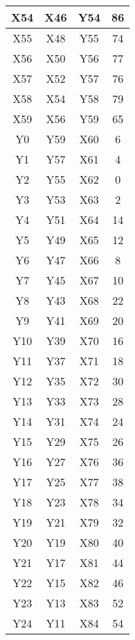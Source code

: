 \begin{longtable}{|c|c|c|c|}
  X54   & X46    & Y54   & 86     \\ \hline
  X55   & X48    & Y55   & 74     \\ \hline
  X56   & X50    & Y56   & 77     \\ \hline
  X57   & X52    & Y57   & 76     \\ \hline
  X58   & X54    & Y58   & 79     \\ \hline
  X59   & X56    & Y59   & 65     \\ \hline
  Y0    & Y59    & X60   & 6      \\ \hline
  Y1    & Y57    & X61   & 4      \\ \hline
  Y2    & Y55    & X62   & 0      \\ \hline
  Y3    & Y53    & X63   & 2      \\ \hline
  Y4    & Y51    & X64   & 14     \\ \hline
  Y5    & Y49    & X65   & 12     \\ \hline
  Y6    & Y47    & X66   & 8      \\ \hline
  Y7    & Y45    & X67   & 10     \\ \hline
  Y8    & Y43    & X68   & 22     \\ \hline
  Y9    & Y41    & X69   & 20     \\ \hline
  Y10   & Y39    & X70   & 16     \\ \hline
  Y11   & Y37    & X71   & 18     \\ \hline
  Y12   & Y35    & X72   & 30     \\ \hline
  Y13   & Y33    & X73   & 28     \\ \hline
  Y14   & Y31    & X74   & 24     \\ \hline
  Y15   & Y29    & X75   & 26     \\ \hline
  Y16   & Y27    & X76   & 36     \\ \hline
  Y17   & Y25    & X77   & 38     \\ \hline
  Y18   & Y23    & X78   & 34     \\ \hline
  Y19   & Y21    & X79   & 32     \\ \hline
  Y20   & Y19    & X80   & 40     \\ \hline
  Y21   & Y17    & X81   & 44     \\ \hline
  Y22   & Y15    & X82   & 46     \\ \hline
  Y23   & Y13    & X83   & 52     \\ \hline
  Y24   & Y11    & X84   & 54     \\ \hline

\end{longtable}
